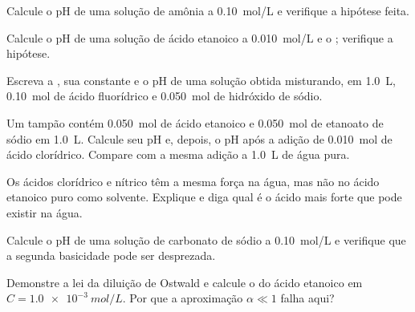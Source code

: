 \begin{exercise}[$\star\star$]\label{exo:b1:predominant-reaction:5}
Calcule o pH de uma solução de amônia a \qty{0.10}{mol/L} e verifique a
hipótese feita.
\end{exercise}

\begin{exercise}[$\star\star$]\label{exo:b1:predominant-reaction:6}
Calcule o pH de uma solução de ácido etanoico a \qty{0.010}{mol/L} e o
; verifique a hipótese.
\end{exercise}

\begin{exercise}[$\star\star$]\label{exo:b1:predominant-reaction:7}
Escreva a , sua constante e o pH de uma solução
obtida misturando, em \qty{1.0}{L}, \qty{0.10}{mol} de ácido fluorídrico
e \qty{0.050}{mol} de hidróxido de sódio.
\end{exercise}

\begin{exercise}[$\star\star$]\label{exo:b1:predominant-reaction:8}
Um tampão contém \qty{0.050}{mol} de ácido etanoico e \qty{0.050}{mol}
de etanoato de sódio em \qty{1.0}{L}. Calcule seu pH e, depois, o pH após
a adição de \qty{0.010}{mol} de ácido clorídrico. Compare com a mesma
adição a \qty{1.0}{L} de água pura.
\end{exercise}

\begin{exercise}[$\star\star$]\label{exo:b1:predominant-reaction:9}
Os ácidos clorídrico e nítrico têm a mesma força na água, mas não no
ácido etanoico puro como solvente. Explique e diga qual é o ácido mais
forte que pode existir na água.
\end{exercise}

\begin{exercise}[$\star\star\star$]\label{exo:b1:predominant-reaction:10}
Calcule o pH de uma solução de carbonato de sódio a \qty{0.10}{mol/L} e
verifique que a segunda basicidade pode ser desprezada.
\end{exercise}

\begin{exercise}[$\star\star\star$]\label{exo:b1:predominant-reaction:11}
Demonstre a lei da diluição de Ostwald e calcule o 
do ácido etanoico em $C = \qty{1.0e-3}{mol/L}$. Por que a aproximação
$\alpha \ll 1$ falha aqui?
\end{exercise}


